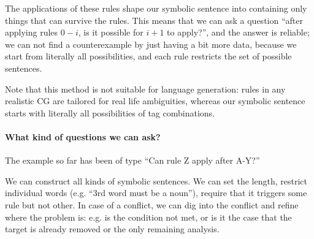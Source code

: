 
The applications of these rules shape our symbolic sentence into containing only things that can survive the rules. This means that we can ask a question ``after applying rules $0-i$, is it possible for $i+1$ to apply?'', and the answer is reliable; we can not find a counterexample by just having a bit more data, because we start from literally all possibilities, and each rule
restricts the set of possible sentences.

Note that this method is not suitable for language generation: rules in any realistic CG are tailored for real life ambiguities, whereas our symbolic sentence starts with literally all possibilities of tag combinations.

\paragraph{What kind of questions we can ask?}

The example so far has been of type ``Can rule Z apply after A-Y?''

We can construct all kinds of symbolic sentences. We can set the length, restrict individual words (e.g. ``3rd word must be a noun''), require that it triggers some rule but not other.
In case of a conflict, we can dig into the conflict and refine where the problem is: e.g. is the condition not met, or is it the case that the target is already removed or the only remaining analysis.




